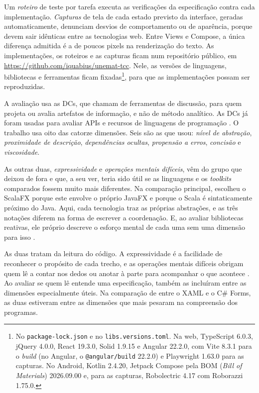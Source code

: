 Um \emph{roteiro} de teste por tarefa executa as verificações da especificação
contra cada implementação.
\emph{Capturas} de tela de cada estado previsto da interface, geradas
automaticamente, denunciam desvios de comportamento ou de aparência,
porque devem sair idênticas entre as tecnologias web.
Entre Views e Compose, a única diferença admitida é a de poucos pixels na
renderização do texto.
As implementações, os roteiros e as capturas ficam num repositório público,
em \url{https://github.com/iquabius/unemat-tcc}.
Nele, as versões de linguagens, bibliotecas e ferramentas ficam
fixadas\footnote{No \texttt{package-lock.json} e no \texttt{libs.versions.toml}.
Na web, TypeScript 6.0.3, jQuery 4.0.0, React 19.3.0, Solid 1.9.15 e Angular
22.2.0, com Vite 8.3.1 para o \emph{build} (no Angular, o \texttt{@angular/build} 22.2.0)
e Playwright 1.63.0 para as capturas.
No Android, Kotlin 2.4.20, Jetpack Compose pela BOM (\emph{Bill of Materials})
2026.09.00 e, para as capturas, Robolectric 4.17 com Roborazzi 1.75.0.}, para que as implementações possam ser reproduzidas.

A avaliação usa as DCs, que \textcite[p. 106]{blackwell2003} chamam de ferramentas
de discussão, para quem projeta ou avalia artefatos de informação, e não
de método analítico.
As DCs já foram usadas para avaliar APIs \cite{clarke2003} e recursos de linguagens de programação
\cite{sadowski2011}.
O trabalho usa oito das catorze dimensões.
Seis são as que \textcite[p. 12-14]{kiss2014} usou: \emph{nível de
abstração}, \emph{proximidade de descrição}, \emph{dependências ocultas},
\emph{propensão a erros}, \emph{concisão} e \emph{viscosidade}.

As outras duas, \emph{expressividade} e \emph{operações mentais difíceis}, vêm do grupo
que \textcite[p. 15]{kiss2014} deixou de fora e que, a seu ver, teria
sido útil se as linguagens e os \emph{toolkits} comparados fossem muito mais
diferentes.
Na comparação principal, \textcite[p. 11-12]{kiss2014} escolheu o
ScalaFX porque este envolve o próprio JavaFX e porque o Scala é
sintaticamente próximo do Java.
Aqui, cada tecnologia traz as próprias abstrações, e as três notações
diferem na forma de escrever a coordenação.
E, ao avaliar bibliotecas reativas, ele próprio descreve o esforço
mental de cada uma sem uma dimensão para isso
\cite[p. 87 e 97]{kiss2014}.

As duas tratam da leitura do código.
A expressividade é a facilidade de reconhecer o propósito de cada
trecho, e as operações mentais difíceis obrigam quem lê a contar nos
dedos ou anotar à parte para acompanhar o que acontece \cite{green1996d}.
Ao avaliar se quem lê entende uma especificação,
\textcite[p. 267]{britton2001} também as incluíram entre as dimensões
especialmente úteis.
Na comparação de \textcite{mernik2009} entre o XAML e o C\# Forms, as duas
estiveram entre as dimensões que mais pesaram na compreensão dos
programas.

